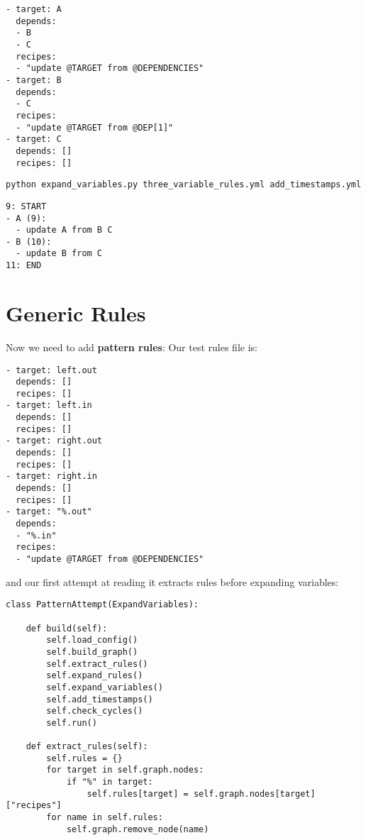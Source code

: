 \documentclass{scrbook}
\newcommand{\glossref}[1]{\textbf{#1}}
\begin{document}
\begin{lstlisting}[frame=single,frameround=tttt]
- target: A
  depends:
  - B
  - C
  recipes:
  - "update @TARGET from @DEPENDENCIES"
- target: B
  depends:
  - C
  recipes:
  - "update @TARGET from @DEP[1]"
- target: C
  depends: []
  recipes: []
\end{lstlisting}



\begin{lstlisting}[frame=single,frameround=tttt]
python expand_variables.py three_variable_rules.yml add_timestamps.yml
\end{lstlisting}



\begin{lstlisting}[frame=single,frameround=tttt]
9: START
- A (9):
  - update A from B C
- B (10):
  - update B from C
11: END
\end{lstlisting}


\section{Generic Rules}\label{builder-generic}


Now we need to add \glossref{pattern rules}:
Our test rules file is:


\begin{lstlisting}[frame=single,frameround=tttt]
- target: left.out
  depends: []
  recipes: []
- target: left.in
  depends: []
  recipes: []
- target: right.out
  depends: []
  recipes: []
- target: right.in
  depends: []
  recipes: []
- target: "%.out"
  depends:
  - "%.in"
  recipes:
  - "update @TARGET from @DEPENDENCIES"
\end{lstlisting}



\noindent and our first attempt at reading it extracts rules before expanding variables:


\begin{lstlisting}[frame=single,frameround=tttt]
class PatternAttempt(ExpandVariables):

    def build(self):
        self.load_config()
        self.build_graph()
        self.extract_rules()
        self.expand_rules()
        self.expand_variables()
        self.add_timestamps()
        self.check_cycles()
        self.run()

    def extract_rules(self):
        self.rules = {}
        for target in self.graph.nodes:
            if "%" in target:
                self.rules[target] = self.graph.nodes[target]["recipes"]
        for name in self.rules:
            self.graph.remove_node(name)
\end{lstlisting}
\end{document}
